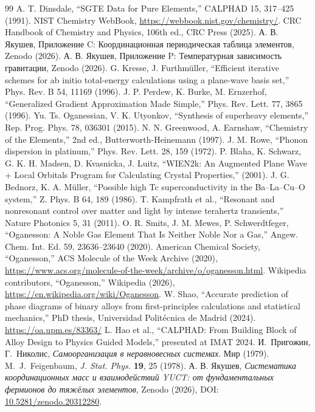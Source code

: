 \documentclass[12pt,a4paper]{article}
\theoremstyle{remark}
\begin{document}
	\begin{thebibliography}{99}
		 A. T. Dinsdale, ``SGTE Data for Pure Elements,'' CALPHAD 15, 317–425 (1991).
		 NIST Chemistry WebBook, \url{https://webbook.nist.gov/chemistry/}.
		 CRC Handbook of Chemistry and Physics, 106th ed., CRC Press (2025).
		 А. В. Якушев, Приложение C: Координационная периодическая таблица элементов, Zenodo (2026).
		 А. В. Якушев, Приложение P: Температурная зависимость гравитации, Zenodo (2026).
		 G. Kresse, J. Furthmüller, ``Efficient iterative schemes for ab initio total-energy calculations using a plane-wave basis set,'' Phys. Rev. B 54, 11169 (1996).
		 J. P. Perdew, K. Burke, M. Ernzerhof, ``Generalized Gradient Approximation Made Simple,'' Phys. Rev. Lett. 77, 3865 (1996).
		 Yu. Ts. Oganessian, V. K. Utyonkov, ``Synthesis of superheavy elements,'' Rep. Prog. Phys. 78, 036301 (2015).
		 N. N. Greenwood, A. Earnshaw, ``Chemistry of the Elements,'' 2nd ed., Butterworth-Heinemann (1997).
		 J. M. Rowe, ``Phonon dispersion in platinum,'' Phys. Rev. Lett. 28, 159 (1972).
		 P. Blaha, K. Schwarz, G. K. H. Madsen, D. Kvasnicka, J. Luitz, ``WIEN2k: An Augmented Plane Wave + Local Orbitals Program for Calculating Crystal Properties,'' (2001).
		 J. G. Bednorz, K. A. Müller, ``Possible high Tc superconductivity in the Ba–La–Cu–O system,'' Z. Phys. B 64, 189 (1986).
		 T. Kampfrath et al., ``Resonant and nonresonant control over matter and light by intense terahertz transients,'' Nature Photonics 5, 31 (2011).
		 O. R. Smits, J. M. Mewes, P. Schwerdtfeger, ``Oganesson: A Noble Gas Element That Is Neither Noble Nor a Gas,'' Angew. Chem. Int. Ed. 59, 23636–23640 (2020).
		 American Chemical Society, ``Oganesson,'' ACS Molecule of the Week Archive (2020), \url{https://www.acs.org/molecule-of-the-week/archive/o/oganesson.html}.
		 Wikipedia contributors, ``Oganesson,'' Wikipedia (2026), \url{https://en.wikipedia.org/wiki/Oganesson}.
		 W. Shao, ``Accurate prediction of phase diagrams of binary alloys from first-principles calculations and statistical mechanics,'' PhD thesis, Universidad Politécnica de Madrid (2024). \url{https://oa.upm.es/83363/}
		 L. Hao et al., ``CALPHAD: From Building Block of Alloy Design to Physics Guided Models,'' presented at IMAT 2024.
		 И.~Пригожин, Г.~Николис, \emph{Самоорганизация в неравновесных системах}. Мир (1979).
		 M.~J.~Feigenbaum, \emph{J. Stat. Phys.} \textbf{19}, 25 (1978).
		 А. В. Якушев, \emph{Систематика координационных масс и взаимодействий YUCT: от фундаментальных фермионов до тяжёлых элементов}, Zenodo (2026), DOI: \href{https://doi.org/10.5281/zenodo.20312280}{10.5281/zenodo.20312280}.
	\end{thebibliography}
	
\end{document}
